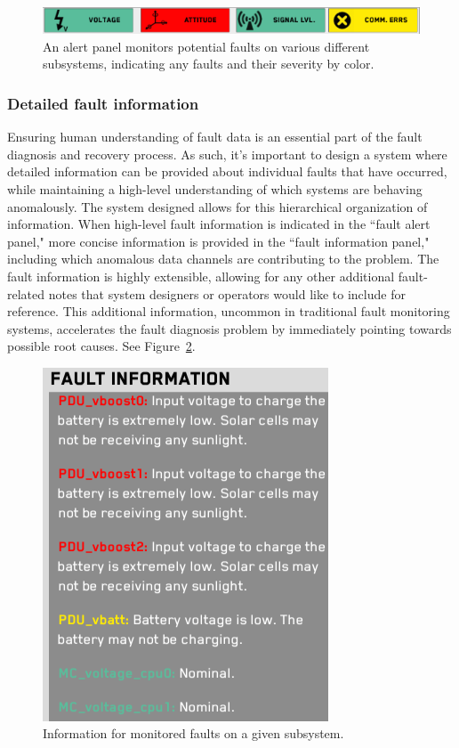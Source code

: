 \begin{figure}[h]
\centering
    \includegraphics[width=\columnwidth]{images/alert_panel.png}
    \caption{An alert panel monitors potential faults on various different subsystems, indicating any faults and their severity by color.}
    \label{fig:alert_panel}
\end{figure}

\subsubsection{Detailed fault information}

Ensuring human understanding of fault data is an essential part of the fault diagnosis and recovery process. As such, it's important to design a system where detailed information can be provided about individual faults that have occurred, while maintaining a high-level understanding of which systems are behaving anomalously. The system designed allows for this hierarchical organization of information. When high-level fault information is indicated in the ``fault alert panel," more concise information is provided in the ``fault information panel," including which anomalous data channels are contributing to the problem. The fault information is highly extensible, allowing for any other additional fault-related notes that system designers or operators would like to include for reference. This additional information, uncommon in traditional fault monitoring systems, accelerates the fault diagnosis problem by immediately pointing towards possible root causes. See Figure~\ref{fig:fault_info2}.

\begin{figure}[h]
\centering
    \includegraphics[width=0.4\columnwidth]{images/fault_info2.png}
    \caption{Information for monitored faults on a given subsystem.}
    \label{fig:fault_info2}
\end{figure}

